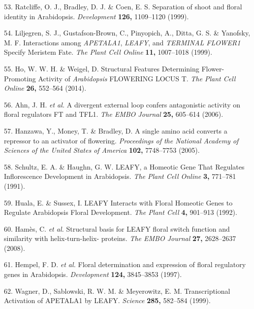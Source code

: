 \documentclass[12pt,]{book}
\begin{document}
\hypertarget{ref-ratcliffe_separation_1999}{}
53. Ratcliffe, O. J., Bradley, D. J. \& Coen, E. S. Separation of shoot
and floral identity in Arabidopsis. \emph{Development} \textbf{126,}
1109--1120 (1999).

\hypertarget{ref-liljegren_interactions_1999}{}
54. Liljegren, S. J., Gustafson-Brown, C., Pinyopich, A., Ditta, G. S.
\& Yanofsky, M. F. Interactions among \emph{APETALA1}, \emph{LEAFY}, and
\emph{TERMINAL FLOWER1} Specify Meristem Fate. \emph{The Plant Cell
Online} \textbf{11,} 1007--1018 (1999).

\hypertarget{ref-ho_structural_2014}{}
55. Ho, W. W. H. \& Weigel, D. Structural Features Determining
Flower-Promoting Activity of \emph{Arabidopsis} FLOWERING LOCUS T.
\emph{The Plant Cell Online} \textbf{26,} 552--564 (2014).

\hypertarget{ref-ahn_divergent_2006}{}
56. Ahn, J. H. \emph{et al.} A divergent external loop confers
antagonistic activity on floral regulators FT and TFL1. \emph{The EMBO
Journal} \textbf{25,} 605--614 (2006).

\hypertarget{ref-hanzawa_single_2005}{}
57. Hanzawa, Y., Money, T. \& Bradley, D. A single amino acid converts a
repressor to an activator of flowering. \emph{Proceedings of the
National Academy of Sciences of the United States of America}
\textbf{102,} 7748--7753 (2005).

\hypertarget{ref-schultz_leafy_1991}{}
58. Schultz, E. A. \& Haughn, G. W. LEAFY, a Homeotic Gene That
Regulates Inflorescence Development in Arabidopsis. \emph{The Plant Cell
Online} \textbf{3,} 771--781 (1991).

\hypertarget{ref-huala_leafy_1992}{}
59. Huala, E. \& Sussex, I. LEAFY Interacts with Floral Homeotic Genes
to Regulate Arabidopsis Floral Development. \emph{The Plant Cell}
\textbf{4,} 901--913 (1992).

\hypertarget{ref-hames_structural_2008}{}
60. Hamès, C. \emph{et al.} Structural basis for LEAFY floral switch
function and similarity with helix-turn-helix- proteins. \emph{The EMBO
Journal} \textbf{27,} 2628--2637 (2008).

\hypertarget{ref-hempel_floral_1997}{}
61. Hempel, F. D. \emph{et al.} Floral determination and expression of
floral regulatory genes in Arabidopsis. \emph{Development} \textbf{124,}
3845--3853 (1997).

\hypertarget{ref-wagner_transcriptional_1999}{}
62. Wagner, D., Sablowski, R. W. M. \& Meyerowitz, E. M. Transcriptional
Activation of APETALA1 by LEAFY. \emph{Science} \textbf{285,} 582--584
(1999).
\end{document}
